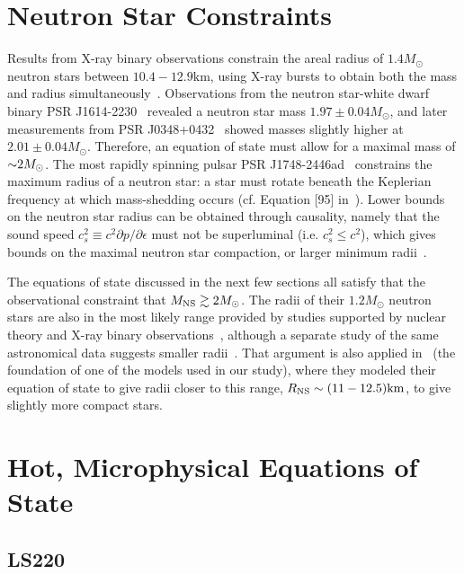 \section{Neutron Star Constraints}
\label{sec:constraints}

Results from X-ray binary observations constrain the areal radius of $1.4M_\odot$ neutron stars between $10.4 - 12.9 \textrm{km}$, using X-ray bursts to obtain both the mass and radius simultaneously~\cite{van1979possible,ozel2006soft}.
Observations from the neutron star-white dwarf binary PSR J1614-2230~\cite{ozel2010massive} revealed a neutron star mass $1.97 \pm 0.04 M_\odot$, and later measurements from PSR J0348+0432~\cite{antoniadis2013massive} showed masses slightly higher at  $2.01 \pm 0.04 M_\odot$.  Therefore, an equation of state must allow for a maximal mass of $\mathord{\sim} 2 M_{\odot}$.
The most rapidly spinning pulsar PSR J1748-2446ad~\cite{hessels2006radio} constrains the maximum radius of a neutron star: a star must rotate beneath the Keplerian frequency at which mass-shedding occurs (cf. Equation [95] in~\cite{lattimer2016equation}).
Lower bounds on the neutron star radius can be obtained through causality, namely that the sound speed $c_s^2 \equiv c^2 \partial p / \partial \epsilon$ must not be superluminal (i.e. $c_s^2 \le c^2$), which gives bounds on the maximal neutron star compaction, or larger minimum radii~\cite{Haensel:1999}.

The equations of state discussed in the next few sections all satisfy that the observational constraint that $M_{\rm NS} \gtrsim 2 M_\odot$.
The radii of their $1.2 M_\odot$ neutron stars are also in the most likely range provided by studies supported by nuclear theory and X-ray binary observations~\cite{Steiner2010,2013ApJ...765L...5S}, although a separate study of the same astronomical data suggests smaller radii~\cite{Guillot:2013wu}.  
That argument is also  applied in~\cite{steiner2013core} (the foundation of one of the models used in our study), where they modeled their equation of state to give radii closer to this range, $R_{\rm NS} \sim (11-12.5) {\rm km}$, to give slightly more compact stars.

\section{Hot, Microphysical Equations of State}
\label{sec:nuclear-eos}

\subsection{LS220}
\label{sec:ls220}

